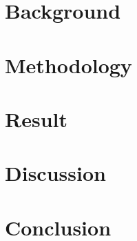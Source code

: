 \documentclass[final,1p,times]{elsarticle}
\begin{document}
\section{Background}
\label{sec:bg}


\section{Methodology}
\label{sec:method}


\section{Result}
\label{sec:res}


\section{Discussion}
\label{sec:dis}


\section{Conclusion}
\label{sec:con}





 

\end{document}

